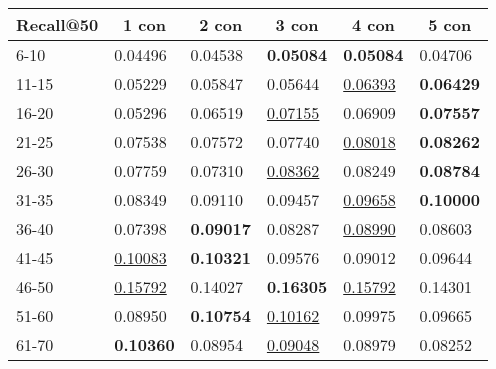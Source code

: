 \begin{table*}[]
    \begin{tabular}{|l|l|l|l|l|l|}
        \hline
        Recall@50 & \multicolumn{1}{c|}{1 con} & \multicolumn{1}{c|}{2 con} & \multicolumn{1}{c|}{3 con} & \multicolumn{1}{c|}{4 con} & \multicolumn{1}{c|}{5 con} \\ \hline
        6-10      & 0.04496                    & 0.04538                    & \textbf{0.05084}           & \textbf{0.05084}           & 0.04706                    \\ \hline
        11-15     & 0.05229                    & 0.05847                    & 0.05644                    & \underline{0.06393}        & \textbf{0.06429}           \\ \hline
        16-20     & 0.05296                    & 0.06519                    & \underline{0.07155}        & 0.06909                    & \textbf{0.07557}           \\ \hline
        21-25     & 0.07538                    & 0.07572                    & 0.07740                    & \underline{0.08018}        & \textbf{0.08262}           \\ \hline
        26-30     & 0.07759                    & 0.07310                    & \underline{0.08362}        & 0.08249                    & \textbf{0.08784}           \\ \hline
        31-35     & 0.08349                    & 0.09110                    & 0.09457                    & \underline{0.09658}        & \textbf{0.10000}           \\ \hline
        36-40     & 0.07398                    & \textbf{0.09017}           & 0.08287                    & \underline{0.08990}        & 0.08603                    \\ \hline
        41-45     & \underline{0.10083}        & \textbf{0.10321}           & 0.09576                    & 0.09012                    & 0.09644                    \\ \hline
        46-50     & \underline{0.15792}        & 0.14027                    & \textbf{0.16305}           & \underline{0.15792}        & 0.14301                    \\ \hline
        51-60     & 0.08950                    & \textbf{0.10754}           & \underline{0.10162}        & 0.09975                    & 0.09665                    \\ \hline
        61-70     & \textbf{0.10360}           & 0.08954                    & \underline{0.09048}        & 0.08979                    & 0.08252                    \\ \hline

\end{tabular}
\end{table*}
